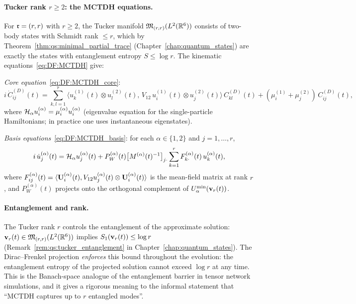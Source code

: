 \begin{example}
\paragraph{Tucker rank $r \geq 2$: the MCTDH equations.}
For $\mathfrak{r} = (r,r)$ with $r \geq 2$, the Tucker manifold
$\mathfrak{M}_{(r,r)}(L^2(\mathbb{R}^6))$ consists of two-body states with Schmidt
rank $\leq r$, which by Theorem~\ref{thm:qs:minimal_partial_trace}
(Chapter~\ref{chap:quantum_states}) are exactly the states with
entanglement entropy $S \leq \log r$. The kinematic
equations~\eqref{eq:DF:MCTDH} give:

\emph{Core equation}~\eqref{eq:DF:MCTDH_core}:
\begin{equation}
\label{eq:DF:mctdh_core}
    i\,\dot{C}^{(D)}_{ij}(t)
    = \sum_{k,l=1}^r \langle u^{(1)}_k(t) \otimes u^{(2)}_l(t),\,
    V_{12}\, u^{(1)}_i(t) \otimes u^{(2)}_j(t)\rangle\,
    C^{(D)}_{kl}(t)
    + (\mu_i^{(1)} + \mu_j^{(2)})\,C^{(D)}_{ij}(t),
\end{equation}
where $\mathcal{H}_\alpha u^{(\alpha)}_i = \mu_i^{(\alpha)}
u^{(\alpha)}_i$ (eigenvalue equation for the single-particle
Hamiltonians; in practice one uses instantaneous eigenstates).

\emph{Basis equations}~\eqref{eq:DF:MCTDH_basis}: for each $\alpha \in
\{1,2\}$ and $j = 1,\ldots,r$,
\begin{equation}
\label{eq:DF:mctdh_basis}
    i\,\dot{u}^{(\alpha)}_j(t)
    = \mathcal{H}_\alpha u^{(\alpha)}_j(t)
    + P^{(\alpha)}_W(t)
    \bigl[M^{(\alpha)}(t)^{-1}\bigr]_{j\cdot}
    \sum_{k=1}^r F^{(\alpha)}_{k\cdot}(t)\,
    u^{(\alpha)}_k(t),
\end{equation}
where $F^{(\alpha)}_{ij}(t) = \langle \mathbf{U}^{(\alpha)}_i(t),
V_{12} u^{(\alpha)}_j(t) \otimes \mathbf{U}^{(\alpha)}_i(t) \rangle$
is the mean-field matrix at rank $r$, and $P^{(\alpha)}_W(t)$
projects onto the orthogonal complement of $U^{\min}_{\alpha}(\mathbf{v}_r(t))$.

\paragraph{Entanglement and rank.}
The Tucker rank $r$ controls the entanglement of the approximate
solution: $\mathbf{v}_r(t) \in \mathfrak{M}_{(r,r)}(L^2(\mathbb{R}^6))$ implies
$S_1(\mathbf{v}_r(t)) \leq \log r$ (Remark~\ref{rem:qs:tucker_entanglement}
in Chapter~\ref{chap:quantum_states}). The Dirac--Frenkel projection
\emph{enforces} this bound throughout the evolution: the entanglement
entropy of the projected solution cannot exceed $\log r$ at any time.
This is the Banach-space analogue of the entanglement barrier in tensor
network simulations, and it gives a rigorous meaning to the informal
statement that ``MCTDH captures up to $r$ entangled modes''.


\end{example}
